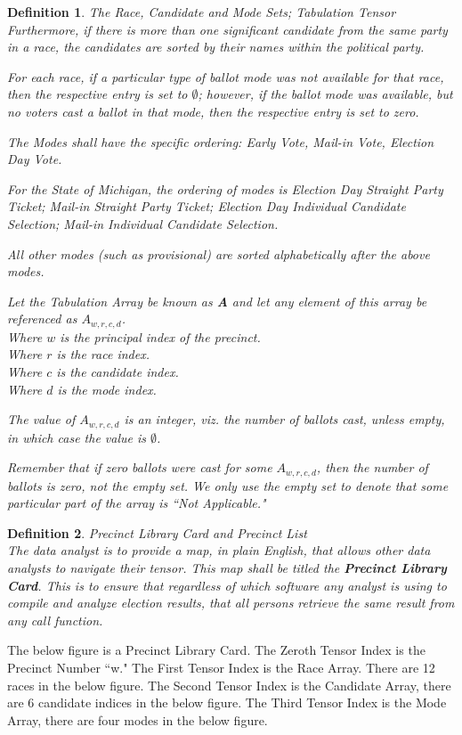 \documentclass[preprint,13pt]{elsarticle}
\newtheorem{definition}{Definition}[section]
\begin{document}
\begin{definition}{The Race, Candidate and Mode Sets; Tabulation Tensor}
Furthermore, if there is more than one significant candidate from the same party in a race, the candidates are sorted by their names within the political party.

For each race, if a particular type of ballot mode was not available for that race, then the respective entry is set to $\emptyset$; however, if the ballot mode was available, but no voters cast a ballot in that mode, then the respective entry is set to zero.

The Modes shall have the specific ordering: Early Vote, Mail-in Vote, Election Day Vote. 

For the State of Michigan, the ordering of modes is Election Day Straight Party Ticket; Mail-in Straight Party Ticket; Election Day Individual Candidate Selection; Mail-in Individual Candidate Selection.

All other modes (such as provisional) are sorted alphabetically after the above modes.

Let the Tabulation Array be known as \textbf{A} and let any element of this array be referenced as $A_{w,r,c,d}$.\\
Where $w$ is the principal index of the precinct.\\
Where $r$ is the race index. \\
Where $c$ is the candidate index.\\
Where $d$ is the mode index.

The value of $A_{w,r,c,d}$ is an integer, viz. the number of ballots cast, unless empty, in which case the value is $\emptyset$.

Remember that if zero ballots were cast for some $A_{w,r,c,d}$, then the number of ballots is zero, not the empty set. We only use the empty set to denote that some particular part of the array is ``Not Applicable."
\end{definition}
\newpage
\begin{definition}{Precinct Library Card and Precinct List}\\
The data analyst is to provide a map, in plain English, that allows other data analysts to navigate their tensor. This map shall be titled the \textbf{Precinct Library Card}. This is to ensure that regardless of which software any analyst is using to compile and analyze election results, that all persons retrieve the same result from any call function.
\end{definition}
The below figure is a Precinct Library Card. The Zeroth Tensor Index is the Precinct Number ``w." The First Tensor Index is the Race Array. There are 12 races in the below figure. The Second Tensor Index is the Candidate Array, there are 6 candidate indices in the below figure. The Third Tensor Index is the Mode Array, there are four modes in the below figure.
\end{document}
